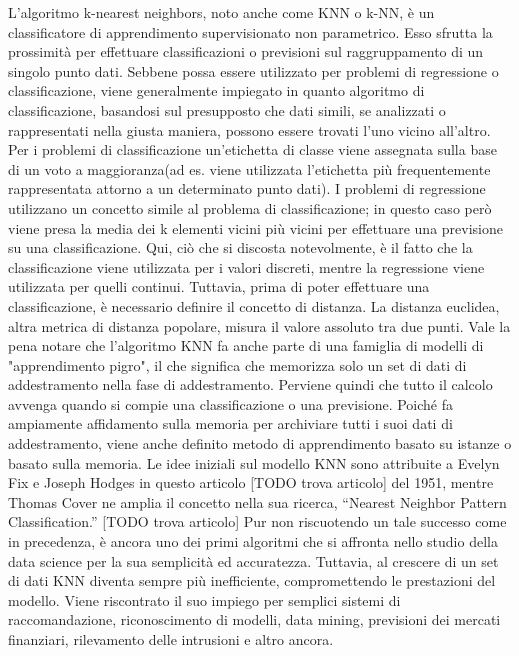 L'algoritmo k-nearest neighbors, noto anche come KNN o k-NN, è un classificatore di apprendimento supervisionato non parametrico.
Esso sfrutta la prossimità per effettuare classificazioni o previsioni sul raggruppamento di un singolo punto dati. 
Sebbene possa essere utilizzato per problemi di regressione o classificazione, viene generalmente impiegato in quanto algoritmo di classificazione, basandosi sul presupposto che dati simili, se analizzati o rappresentati nella giusta maniera, possono essere trovati l'uno vicino all'altro.
Per i problemi di classificazione un'etichetta di classe viene assegnata sulla base di un voto a maggioranza(ad es. viene utilizzata l'etichetta più frequentemente rappresentata attorno a un determinato punto dati).
I problemi di regressione utilizzano un concetto simile al problema di classificazione; in questo caso però viene presa la media dei k elementi vicini più vicini per effettuare una previsione su una classificazione. 
Qui, ciò che si discosta notevolmente, è il fatto che la classificazione viene utilizzata per i valori discreti, mentre la regressione viene utilizzata per quelli continui. 
Tuttavia, prima di poter effettuare una classificazione, è necessario definire il concetto di distanza. 
La distanza euclidea, altra metrica di distanza popolare, misura il valore assoluto tra due punti.
Vale la pena notare che l'algoritmo KNN fa anche parte di una famiglia di modelli di "apprendimento pigro", il che significa che memorizza solo un set di dati di addestramento nella fase di addestramento. 
Perviene quindi che tutto il calcolo avvenga quando si compie una classificazione o una previsione. 
Poiché fa ampiamente affidamento sulla memoria per archiviare tutti i suoi dati di addestramento, viene anche definito metodo di apprendimento basato su istanze o basato sulla memoria.
Le idee iniziali sul modello KNN sono attribuite a Evelyn Fix e Joseph Hodges in questo articolo [TODO trova articolo] del 1951, mentre Thomas Cover ne amplia il concetto nella sua ricerca, “Nearest Neighbor Pattern Classification.” [TODO trova articolo] 
Pur non riscuotendo un tale successo come in precedenza, è ancora uno dei primi algoritmi che si affronta nello studio della data science per la sua semplicità ed accuratezza. 
Tuttavia, al crescere di un set di dati KNN diventa sempre più inefficiente, compromettendo le prestazioni del modello. 
Viene riscontrato il suo impiego per semplici sistemi di raccomandazione, riconoscimento di modelli, data mining, previsioni dei mercati finanziari, rilevamento delle intrusioni e altro ancora. 

